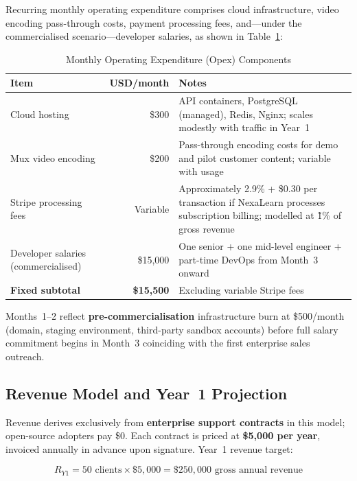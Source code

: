 Recurring monthly operating expenditure comprises cloud infrastructure, video encoding pass-through costs, payment processing fees, and---under the commercialised scenario---developer salaries, as shown in Table~\ref{tab:opex-breakdown}:

\begin{table}[H]
  \centering
  \caption{Monthly Operating Expenditure (Opex) Components}
  \label{tab:opex-breakdown}
  \begin{tabular}{@{}lrp{7.2cm}@{}}
    \toprule
    \textbf{Item} & \textbf{USD/month} & \textbf{Notes} \\
    \midrule
    Cloud hosting &
    \$300 &
    API containers, PostgreSQL (managed), Redis, Nginx; scales modestly with traffic in Year~1 \\
    \addlinespace
    Mux video encoding &
    \$200 &
    Pass-through encoding costs for demo and pilot customer content; variable with usage \\
    \addlinespace
    Stripe processing fees &
    Variable &
    Approximately 2.9\% + \$0.30 per transaction if NexaLearn processes subscription billing; modelled at \~1\% of gross revenue \\
    \addlinespace
    Developer salaries (commercialised) &
    \$15,000 &
    One senior + one mid-level engineer + part-time DevOps from Month~3 onward \\
    \midrule
    \textbf{Fixed subtotal} & \textbf{\$15,500} & Excluding variable Stripe fees \\
    \bottomrule
  \end{tabular}
\end{table}

Months~1--2 reflect \textbf{pre-commercialisation} infrastructure burn at \$500/month (domain, staging environment, third-party sandbox accounts) before full salary commitment begins in Month~3 coinciding with the first enterprise sales outreach.

\subsection{Revenue Model and Year~1 Projection}
\label{subsec:revenue}

Revenue derives exclusively from \textbf{enterprise support contracts} in this model; open-source adopters pay \$0. Each contract is priced at \textbf{\$5,000 per year}, invoiced annually in advance upon signature. Year~1 revenue target:

\begin{equation}
  R_{Y1} = 50 \text{ clients} \times \$5{,}000 = \$250{,}000 \text{ gross annual revenue}
  \label{eq:revenue-y1}
\end{equation}

